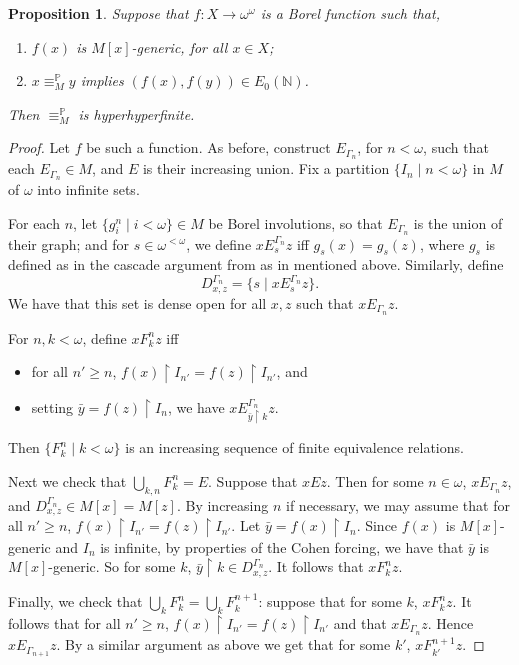 \documentclass{amsart}
\newtheorem{proposition}[theorem]{Proposition}
\theoremstyle{definition}
\theoremstyle{remark}
\begin{document}
\begin{proposition}
\label{prop : weak uniformization}
Suppose that $f\colon X\to \omega^\omega$ is a Borel function such that,
\begin{enumerate}
\item
$f(x)$ is \(M[x]\)-generic, for all \(x\in X\);
\item
$x\equiv^\mathbb{P}_M y$ implies $({f(x)},{f(y)})\in E_0(\mathbb{N})$.

\end{enumerate}
Then $\equiv^\mathbb{P}_M$ is hyperhyperfinite.

\end{proposition}
\begin{proof}
Let $f$ be such a function. As before, construct $E_{\Gamma_n}$, for $n<\omega$,  such that each $E_{\Gamma_n}\in M$, and $E$ is their increasing union. Fix a partition $\{I_n\mid n<\omega\}$ in $M$ of $\omega$ into infinite sets.

For each $n$, let $\{g^n_i\mid i<\omega\}\in M$ be Borel involutions, so that $E_{\Gamma_n}$ is the union of their graph; and for $s\in\omega^{<\omega}$, we define $x\mathbin{E^{\Gamma_n}_s}z$ iff $g_s(x)=g_s(z)$, where $g_s$ is defined as in the cascade argument from as in \cite[Theorem~12.1]{KecMil} mentioned above. Similarly, define $$D^{\Gamma_n}_{x,z} = \{s\mid x\mathbin{E^{\Gamma_n}_s}z\}.$$ We have that this set is dense open for all $x,z$ such that $x\mathbin{E_{\Gamma_n}}z$.

For $n,k<\omega$, define $xF^n_kz$ iff
 \begin{itemize}
 \item
 for all $n'\geq n$, $f(x)\upharpoonright I_{n'} = f(z)\upharpoonright I_{n'}$, and
 \item
 setting $\bar{y} = f(z)\upharpoonright I_n$, we have $x\mathbin{E_{\bar{y}\upharpoonright k}^{\Gamma_n}}z$.
\end{itemize}
Then $\{ F^n_k\mid k<\omega\}$ is an increasing sequence of finite equivalence relations.

Next we check that $\bigcup_{k,n} F^n_k=E$. Suppose that
$xEz$. Then for some $n\in\omega$, $x\mathbin{E_{\Gamma_n}}z$, and $D^{\Gamma_n}_{x,z}\in M[x]=M[z]$. By increasing $n$ if necessary, we may assume that for all  $n'\geq n$, $f(x)\upharpoonright I_{n'} = f(z)\upharpoonright I_{n'}$. Let  $\bar{y} = f(x)\upharpoonright I_n$. Since $f(x)$ is $M[x]$-generic and $I_n$ is infinite, by properties of the Cohen forcing, we have that  $\bar{y}$ is $M[x]$-generic. So for some $k$, $\bar{y}\upharpoonright k\in D^{\Gamma_n}_{x,z}$. It follows that $xF^n_kz$.

Finally, we  check that $\bigcup_k F^n_k=\bigcup_k F^{n+1}_k$:
suppose that for some $k$, $xF^n_kz$. It follows that for all $n'\geq n$, $f(x)\upharpoonright I_{n'} = f(z)\upharpoonright I_{n'}$ and that $x\mathbin{E_{\Gamma_n}}z$. Hence $x\mathbin{E_{\Gamma_{n+1}}}z$. By a similar argument as above we get that for some $k'$, $x\mathbin{F^{n+1}_{k'}}z$.
\end{proof}
\end{document}
